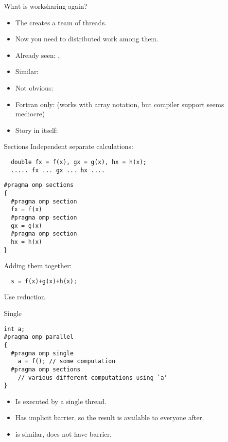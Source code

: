
\begin{frame}[containsverbatim]{What is worksharing again?}
  \begin{itemize}
  \item The  creates a team of threads.
  \item Now you need to distributed work among them.
  \item Already seen: , 
  \item Similar: 
  \item Not obvious: 
  \item Fortran only:  (works with array notation, but
    compiler support seems mediocre)
  \item Story in itself: 
  \end{itemize}
\end{frame}

\begin{frame}[containsverbatim]{Sections}
\small
Independent separate calculations:
\begin{verbatim}
  double fx = f(x), gx = g(x), hx = h(x);
  ..... fx ... gx ... hx ....
\end{verbatim}
\begin{verbatim}
#pragma omp sections
{
  #pragma omp section
  fx = f(x)
  #pragma omp section
  gx = g(x)
  #pragma omp section
  hx = h(x)
}
\end{verbatim}
Adding them together:
\begin{verbatim}
  s = f(x)+g(x)+h(x);
\end{verbatim}
Use reduction.
\end{frame}

\begin{frame}[containsverbatim]{Single}
\begin{verbatim}
int a;
#pragma omp parallel
{
  #pragma omp single
    a = f(); // some computation
  #pragma omp sections
    // various different computations using `a'
}
\end{verbatim}
  \begin{itemize}
  \item Is executed by a single thread.
  \item Has implicit barrier, so the result is available to everyone
    after.
  \item {} is similar, does not have barrier.
  \end{itemize}
\end{frame}

